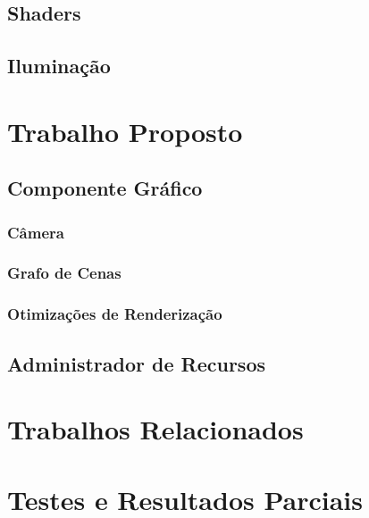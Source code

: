 \section{Shaders}

\section{Iluminação}

\chapter{Trabalho Proposto}
\label{cap2}

\section{Componente Gráfico}

\subsection{Câmera}

\subsection{Grafo de Cenas}

\subsection{Otimizações de Renderização}

\section{Administrador de Recursos}

\chapter{Trabalhos Relacionados}
\label{cap3}

\chapter{Testes e Resultados Parciais}
\label{cap4}
